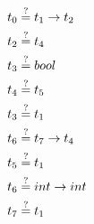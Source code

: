 \begin{align*}
  t_0 &\stackrel{?}{=} t_1 \to t_2 \\
  t_2 &\stackrel{?}{=} t_4 \\
  t_3 &\stackrel{?}{=} bool \\
  t_4 &\stackrel{?}{=} t_5 \\
  t_3 &\stackrel{?}{=} t_1 \\
  t_6 &\stackrel{?}{=} t_7 \to t_4 \\
  t_5 &\stackrel{?}{=} t_1 \\
  t_6 &\stackrel{?}{=} int \to int \\
  t_7 &\stackrel{?}{=} t_1
\end{align*}